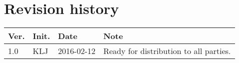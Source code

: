 \chapter*{Revision history}
\label{app:rev_his}

\renewcommand\arraystretch{1.5}
\begin{tabular}{b{1cm} b{1cm} b{2cm} b{8cm}}
    \textbf{Ver.} & \textbf{Init.} & \textbf{Date} & \textbf{Note} \\
    \hline
    1.0 & KLJ & 2016-02-12 & Ready for distribution to all parties. \\
\end{tabular}
\renewcommand\arraystretch{1}